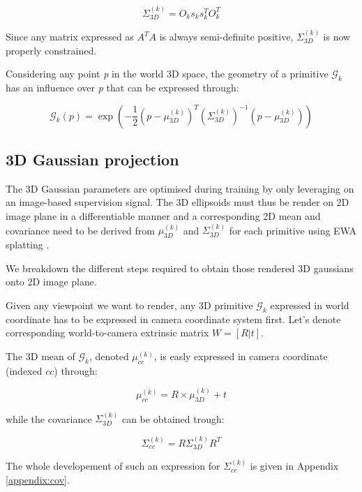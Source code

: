 \begin{equation}
    \Sigma^{(k)}_{3D} = O_{k}s_{k}s_{k}^{T}O_{k}^{T}
\end{equation}

Since any matrix expressed as $A^{T}A$ is always semi-definite positive, $\Sigma^{(k)}_{3D}$ is now properly constrained. 

Considering any point \textit{p} in the world 3D space, the geometry of a primitive $\mathcal{G}_{k}$ has an influence over \textit{p} that can be expressed through: 

\begin{equation}
  \mathcal{G}_{k}(p) = \exp \left(-\frac{1}{2}(p-\mu^{(k)}_{3D})^{T}(\Sigma^{(k)}_{3D})^{-1}(p-\mu^{(k)}_{3D})\right)
\end{equation}

\subsection{3D Gaussian projection} The 3D Gaussian parameters are optimised during training by only leveraging on an image-based supervision signal. The 3D ellipsoids must thus be render on 2D image plane in a differentiable manner and a corresponding 2D mean and covariance need to be derived from $\mu^{(k)}_{3D}$ and $\Sigma^{(k)}_{3D}$ for each primitive using EWA splatting \citep{zwicker2001ewa}. 

We breakdown the different steps required to obtain those rendered 3D gaussians onto 2D image plane. 

Given any viewpoint we want to render, any 3D primitive $\mathcal{G}_{k}$ expressed in world coordinate has to be expressed in camera coordinate system first. Let's denote corresponding world-to-camera extrinsic matrix $W=[R|t]$. 

The 3D mean of $\mathcal{G}_{k}$, denoted $\mu^{(k)}_{cc}$, is easly expressed in camera coordinate (indexed $cc$) through: 

\begin{equation}
  \mu^{(k)}_{cc} = R\times \mu^{(k)}_{3D}+t
\end{equation}

while the covariance $\Sigma^{(k)}_{3D}$ can be obtained trough: 

\begin{equation}
  \Sigma^{(k)}_{cc}= R\Sigma^{(k)}_{3D}R^{T}
  \label{eq:gs-3dcov-transfrom}
\end{equation}

The whole developement of such an expression for $\Sigma^{(k)}_{cc}$ is given in Appendix \ref{appendix:cov}. 

